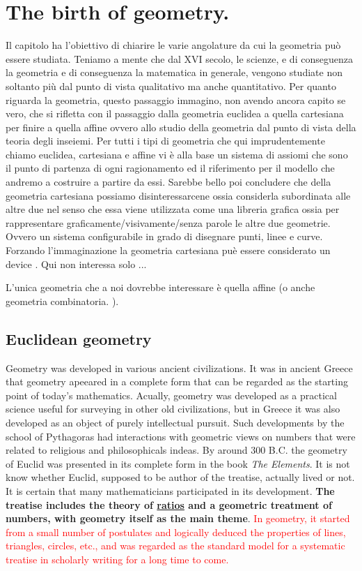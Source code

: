 \chapter{The birth of geometry. \cite{ueno01}}

Il capitolo ha l'obiettivo di chiarire le varie angolature da cui la geometria pu\`o essere studiata. Teniamo a mente che dal XVI secolo, le scienze, e di conseguenza la geometria e di conseguenza la matematica in generale,  vengono studiate non soltanto pi\`u dal punto di vista qualitativo ma anche quantitativo. Per quanto riguarda la geometria, questo passaggio immagino, non avendo ancora capito se vero, che si rifletta con il passaggio dalla geometria euclidea a quella cartesiana per finire a quella affine ovvero allo studio della geometria dal punto di vista della teoria degli inseiemi. Per tutti i tipi di geometria che qui imprudentemente chiamo euclidea, cartesiana e affine vi \`e alla base un sistema di assiomi che sono il punto di partenza di ogni ragionamento ed il riferimento per il modello che andremo a costruire a partire da essi.
Sarebbe bello poi concludere che della geometria cartesiana possiamo disinteressarcene ossia considerla subordinata alle altre due nel senso che essa viene utilizzata come una libreria grafica ossia per rappresentare graficamente/visivamente/senza parole le altre due geometrie. Ovvero un sistema configurabile in grado di disegnare punti, linee e curve. Forzando l'immaginazione la geometria cartesiana pu\`e essere considerato un device \cite{vonNeumann1944}. Qui non interessa solo ...

L'unica geometria che a noi dovrebbe interessare \`e quella affine (o anche geometria combinatoria. \cite{magliveras01}).

\section{Euclidean geometry}
Geometry was developed in various ancient civilizations. It was in ancient Greece that geometry apeeared in a complete form that can be regarded as the starting point of today's mathematics. Acually, geometry was developed as a practical science useful for surveying in other old civilizations, but in Greece it was also developed as an object of purely intellectual pursuit. Such developments by the school of Pythagoras had interactions with geometric views on numbers that were related to religious and philosophicals indeas. By around 300 B.C. the geometry of Euclid was presented in its complete form in the book \emph{The Elements}. It is not know whether Euclid, supposed to be author of the treatise, actually lived or not. It is certain that many mathematicians participated in its development. \textbf{The treatise includes the theory of \underline{ratios} and a geometric treatment of numbers, with geometry itself as the main theme}. \textcolor{red}{In geometry, it started from a small number of postulates and logically deduced the properties of lines, triangles, circles, etc., and was regarded as the standard model for a systematic treatise in scholarly writing for a long time to come.}

